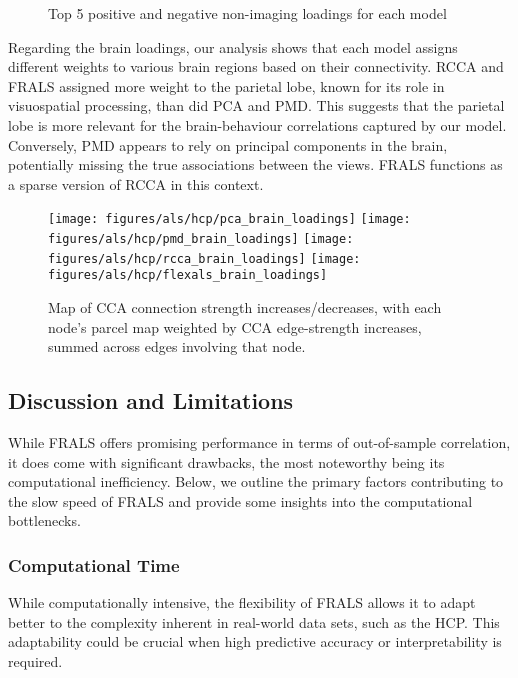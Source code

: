 \begin{figure}[h]
\centering

\caption*{Top 5 positive and negative non-imaging loadings for each model}
\label{fig:behaviour}
\end{figure}

Regarding the brain loadings, our analysis shows that each model assigns different weights to various brain regions
based on their connectivity.
RCCA and FRALS assigned more weight to the parietal lobe, known for its role in visuospatial processing, than did PCA and PMD. This suggests that the parietal lobe is more relevant for the brain-behaviour correlations captured by our model.
Conversely, PMD appears to rely on principal components in the brain, potentially missing the true associations between the views.
FRALS functions as a sparse version of RCCA in this context.

\begin{figure}[h]
\centering
\texttt{[image: figures/als/hcp/pca\_brain\_loadings]}
\texttt{[image: figures/als/hcp/pmd\_brain\_loadings]}
\texttt{[image: figures/als/hcp/rcca\_brain\_loadings]}
\texttt{[image: figures/als/hcp/flexals\_brain\_loadings]}
\caption*{Map of CCA connection strength increases/decreases, with each node’s parcel map weighted by CCA edge-strength increases, summed across edges involving that node.}
\label{fig:brain}
\end{figure}

\subsection{Discussion and Limitations}

While FRALS offers promising performance in terms of out-of-sample correlation, it does come with significant drawbacks, the most noteworthy being its computational inefficiency. Below, we outline the primary factors contributing to the slow speed of FRALS and provide some insights into the computational bottlenecks.

\subsubsection{Computational Time}\label{subsec:computational-time}
While computationally intensive, the flexibility of FRALS allows it to adapt better to the complexity inherent in real-world data sets, such as the HCP. This adaptability could be crucial when high predictive accuracy or interpretability is required.

